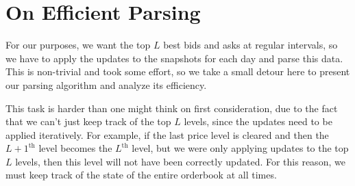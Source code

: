 \begin{table}[ht]
    \centering
    \caption{Example updates data for BTCUSDT.}
    \label{table:updates}
\end{table}


\section{On Efficient Parsing}

For our purposes, we want the top $L$ best bids and asks at regular intervals, so
we have to apply the updates to the snapshots for each day and parse this data.
This is non-trivial and took some effort, so we take a small detour here to 
present our parsing algorithm and analyze its efficiency.

This task is harder than one might think on first consideration, due to the fact
that we can't just keep track of the top $L$ levels, since the updates need to be applied
iteratively. For example, if the last price level is cleared and then the $L+1^{\text{th}}$ level
becomes the $L^{\text{th}}$ level, but we were only applying updates to the top $L$ levels,
then this level will not have been correctly updated. For this reason, we must keep track
of the state of the entire orderbook at all times.

